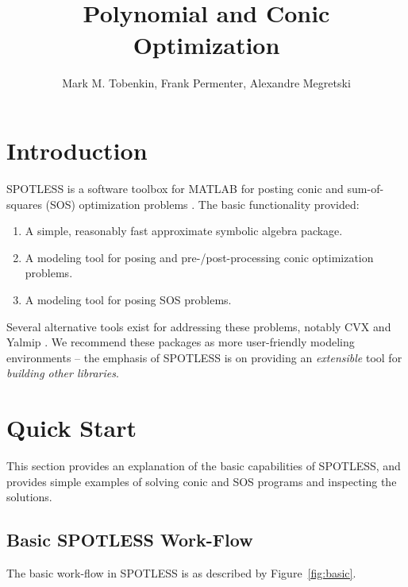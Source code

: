 \documentclass{scrartcl}
\title{\spotless \\ Polynomial and Conic Optimization}
\author{ Mark M. Tobenkin, Frank Permenter, Alexandre Megretski}
\newcommand{\spotless}{SPOT{\relsize{-2}LESS}\xspace}
\begin{document}
\maketitle
\tableofcontents
\section{Introduction}
\spotless is a software toolbox for MATLAB for posting conic \cite{cone} and sum-of-squares (SOS) optimization problems \cite{sos}.
The basic functionality provided:
\begin{enumerate}
\item A simple, reasonably fast approximate symbolic algebra package.
\item A modeling tool for posing and pre-/post-processing conic optimization problems.
\item A modeling tool for posing SOS problems.
\end{enumerate}
Several alternative tools exist for addressing these problems, notably  CVX \cite{cvx} and Yalmip \cite{yalmip}.  We recommend these packages as more user-friendly modeling environments -- the emphasis of \spotless is on providing an {\it extensible} tool for {\it  building other libraries}.





\section{Quick Start}
This section provides an explanation of the basic capabilities of \spotless, and provides simple examples of solving conic and SOS programs and inspecting the solutions.

\subsection{Basic \spotless Work-Flow}
The basic work-flow in \spotless is as described by Figure~\ref{fig:basic}.
\end{document}
